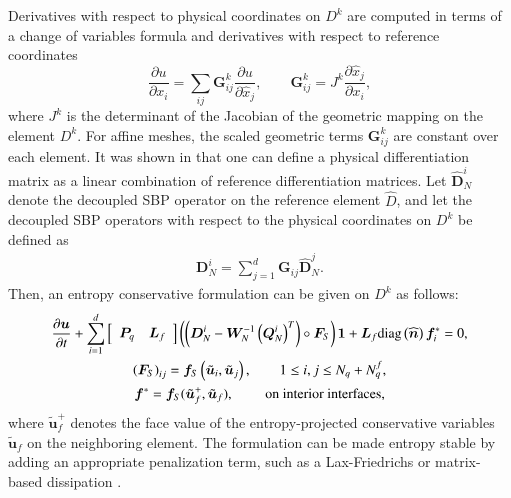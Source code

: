 \documentclass[preprint,10pt]{elsarticle}
\theoremstyle{definition}
\theoremstyle{lemma}
\theoremstyle{corollary}
\theoremstyle{theorem}
\theoremstyle{assumption}
\renewcommand{\hat}[1]{\widehat{#1}}
\newcommand{\pd}[2]{\frac{\partial#1}{\partial#2}}
\newcommand{\LRp}[1]{\left( #1 \right)}
\newcommand{\LRs}[1]{\left[ #1 \right]}
\newcommand{\diag}[1]{{\rm diag}\LRp{#1}}
\begin{document}
Derivatives with respect to physical coordinates on $D^k$ are computed in terms of a change of variables formula and derivatives with respect to reference coordinates 
\[
\pd{u}{x_i} = \sum_{ij} \bm{G}^k_{ij}\pd{u}{\hat{x}_j}, \qquad \bm{G}^k_{ij} = J^k\pd{\hat{x}_j}{{x}_i}, 
\]
where $J^k$ is the determinant of the Jacobian of the geometric mapping on the element $D^k$.
For affine meshes, the scaled geometric terms $\bm{G}^k_{ij}$ are constant over each element.  It was shown in \cite{chan2017discretely} that one can define a physical differentiation matrix as a linear combination of reference differentiation matrices.  Let $\hat{\bm{D}}^i_N$ denote the decoupled SBP operator on the reference element $\hat{D}$, and let the decoupled SBP operators with respect to the physical coordinates on $D^k$ be defined as
\begin{align}
{\bm{D}}^i_N = \sum_{j=1}^d \bm{G}_{ij}\hat{\bm{D}}^j_N.
\end{align}
Then, an entropy conservative formulation can be given on $D^k$ as follows:
\begin{gather}
\pd{\bm{u}}{t} + \sum_{i=1}^d \LRs{\begin{array}{cc}
\bm{P}_q & \bm{L}_f\end{array}} \LRp{\LRp{\bm{D}^i_N - \bm{W}_N^{-1}\LRp{\bm{Q}^i_N}^T} \circ \bm{F}_S}\bm{1} + \bm{L}_f \diag{\hat{\bm{n}}}\bm{f}_i^* = 0, \label{eq:skewform}\\
\LRp{\bm{F}_S}_{ij} = \bm{f}_S\LRp{\tilde{\bm{u}}_i,\tilde{\bm{u}}_j}, \qquad 1\leq i,j\leq N_q + N^f_q, \nonumber\\
\bm{f}^* = \bm{f}_S(\tilde{\bm{u}}_f^+,\tilde{\bm{u}}_f), \qquad \text{ on interior interfaces,} \nonumber
\end{gather}
where $\tilde{\bm{u}}_f^+$ denotes the face value of the entropy-projected conservative variables $\tilde{\bm{u}}_f$ on the neighboring element.  The formulation can be made entropy stable by adding an appropriate penalization term, such as a Lax-Friedrichs or matrix-based dissipation \cite{winters2017uniquely, chen2017entropy, chan2017discretely}.  
\end{document}
